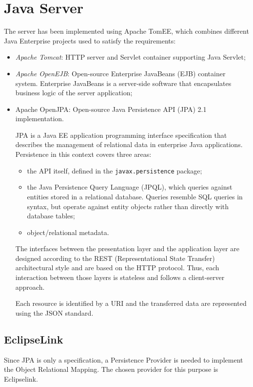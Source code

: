 \documentclass[a4paper,oneside,11pt]{book}
\begin{document}
    \section{Java Server}
    The server has been implemented using Apache TomEE, which combines different Java Enterprise projects used to satisfy the requirements:
    \begin{itemize}
        \item \textit{Apache Tomcat}: HTTP server and Servlet container supporting Java Servlet;
        \item \textit{Apache OpenEJB}: Open-source Enterprise JavaBeans (EJB) container system. Enterprise JavaBeans is a server-side software that encapsulates business logic of the server application;
        \item Apache OpenJPA: Open-source Java Persistence API (JPA) 2.1 implementation. \par
        JPA is a Java EE application programming interface specification that describes the management of relational data in enterprise Java applications. Persistence in this context covers three areas:
            \begin{itemize}
                \item the API itself, defined in the \texttt{javax.persistence} package;
                \item the Java Persistence Query Language (JPQL), which queries against entities stored in a relational database. Queries resemble SQL queries in syntax, but operate against entity objects rather than directly with database tables;
                \item object/relational metadata.
            \end{itemize}
        The interfaces between the presentation layer and the application layer are designed according to the REST (Representational State Transfer) architectural style and are based on the HTTP protocol. Thus, each interaction between those layers is stateless and follows a client-server approach. \par
        Each resource is identified by a URI and the transferred data are represented using the JSON standard. 
    \end{itemize}
    
    \subsection{EclipseLink}
    Since JPA is only a specification, a Persistence Provider is needed to implement the Object Relational Mapping. The chosen provider for this purpose is Eclipselink.
\end{document}
